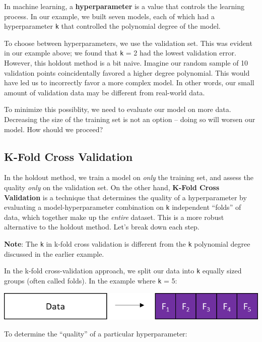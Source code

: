 \documentclass[
  letterpaper,
  DIV=11,
  numbers=noendperiod]{scrreprt}
\begin{document}
In machine learning, a \textbf{hyperparameter} is a value that controls
the learning process. In our example, we built seven models, each of
which had a hyperparameter \texttt{k} that controlled the polynomial
degree of the model.

To choose between hyperparameters, we use the validation set. This was
evident in our example above; we found that \texttt{k} = 2 had the
lowest validation error. However, this holdout method is a bit naive.
Imagine our random sample of 10 validation points coincidentally favored
a higher degree polynomial. This would have led us to incorrectly favor
a more complex model. In other words, our small amount of validation
data may be different from real-world data.

To minimize this possiblity, we need to evaluate our model on more data.
Decreasing the size of the training set is not an option -- doing so
will worsen our model. How should we proceed?

\hypertarget{k-fold-cross-validation}{%
\subsection{K-Fold Cross Validation}\label{k-fold-cross-validation}}

In the holdout method, we train a model on \emph{only} the training set,
and assess the quality \emph{only} on the validation set. On the other
hand, \textbf{K-Fold Cross Validation} is a technique that determines
the quality of a hyperparameter by evaluating a model-hyperparameter
combination on \texttt{k} independent ``folds'' of data, which together
make up the \emph{entire} dataset. This is a more robust alternative to
the holdout method. Let's break down each step.

\textbf{Note}: The \texttt{k} in k-fold cross validation is different
from the \texttt{k} polynomial degree discussed in the earlier example.

In the k-fold cross-validation approach, we split our data into
\texttt{k} equally sized groups (often called folds). In the example
where \texttt{k} = 5:

\includegraphics{cv_regularization/images/cvfolds.png}

To determine the ``quality'' of a particular hyperparameter:
\end{document}
